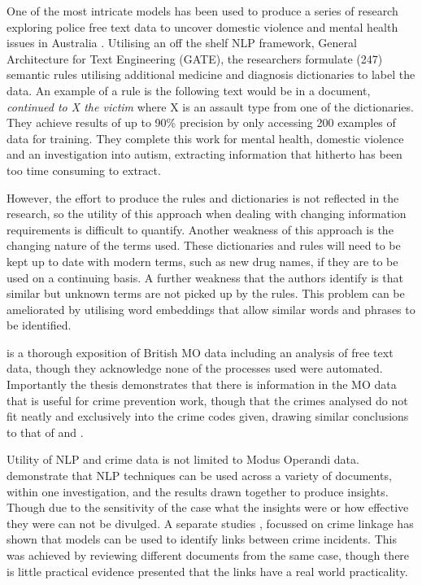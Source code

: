 One of the most intricate models has been used to produce a series of research exploring police free text data to uncover domestic violence and mental health issues in Australia  \parencite{karystianis2018automatic, karystianis2019automated, Hwang2020}. Utilising an off the shelf NLP framework, General Architecture for Text Engineering (GATE), the researchers formulate (247) semantic rules utilising additional medicine and diagnosis dictionaries  to label the data. An example of a rule is the following text would be in a document,  \emph{continued to X the victim} where X is an assault type from one of the dictionaries. They achieve results of up to 90\% precision by only accessing 200 examples of data for training. They complete this work for mental health, domestic violence and an investigation into autism, extracting information that hitherto has been too time consuming to extract. 

However, the effort to produce the rules and dictionaries is not reflected in the research, so the utility of this approach when dealing with changing information requirements is difficult to quantify. Another weakness of this approach is the changing nature of the terms used. These dictionaries and rules will need to be kept up to date with modern terms, such as new drug names, if they are to be used on a continuing basis. A further weakness that the authors identify is that similar but unknown terms are not picked up by the rules. This problem can be ameliorated by utilising word embeddings that allow similar words and phrases to be identified.

\textcite{rogerson2016utility} is a thorough exposition of British MO data including an analysis of free text data, though they acknowledge none of the processes used were automated. Importantly the thesis demonstrates that there is information in the MO data that is useful for crime prevention work, though that the crimes analysed do not fit neatly and exclusively into the crime codes given, drawing similar conclusions to that of \textcite{birks2020unsupervised} and \textcite{kuang2017crime}. 

 
Utility of NLP and crime data is not limited to Modus Operandi data. \textcite{Helbich2013326} demonstrate that NLP techniques can be used across a variety of documents, within one investigation, and the results drawn together to produce  insights. Though due to the sensitivity of the case what the insights were or how effective they were can not be divulged. A separate studies  \parencite{cocx2006distance}, focussed on crime linkage has shown that models can be used to identify links between crime incidents. This was achieved by reviewing different documents from the same case, though there is little practical evidence presented that the links have a real world practicality. 

